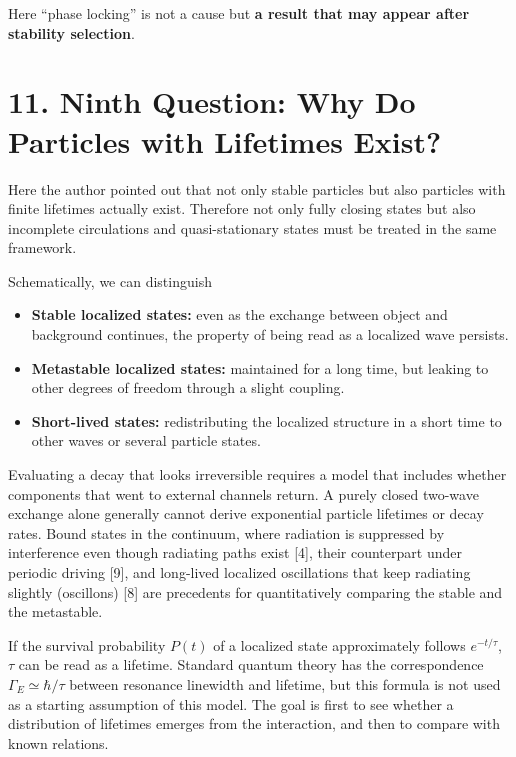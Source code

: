 \documentclass[
  a4paper,
]{article}
\providecommand{\tightlist}{%
  \setlength{\itemsep}{0pt}\setlength{\parskip}{0pt}}
\begin{document}
Here ``phase locking'' is not a cause but \textbf{a result that may
appear after stability selection}.

\section{11. Ninth Question: Why Do Particles with Lifetimes
Exist?}\label{ninth-question-why-do-particles-with-lifetimes-exist}

Here the author pointed out that not only stable particles but also
particles with finite lifetimes actually exist. Therefore not only fully
closing states but also incomplete circulations and quasi-stationary
states must be treated in the same framework.

Schematically, we can distinguish

\begin{itemize}
\tightlist
\item
  \textbf{Stable localized states:} even as the exchange between object
  and background continues, the property of being read as a localized
  wave persists.
\item
  \textbf{Metastable localized states:} maintained for a long time, but
  leaking to other degrees of freedom through a slight coupling.
\item
  \textbf{Short-lived states:} redistributing the localized structure in
  a short time to other waves or several particle states.
\end{itemize}

Evaluating a decay that looks irreversible requires a model that
includes whether components that went to external channels return. A
purely closed two-wave exchange alone generally cannot derive
exponential particle lifetimes or decay rates. Bound states in the
continuum, where radiation is suppressed by interference even though
radiating paths exist {[}4{]}, their counterpart under periodic driving
{[}9{]}, and long-lived localized oscillations that keep radiating
slightly (oscillons) {[}8{]} are precedents for quantitatively comparing
the stable and the metastable.

If the survival probability \(P(t)\) of a localized state approximately
follows \(e^{-t/\tau}\), \(\tau\) can be read as a lifetime. Standard
quantum theory has the correspondence \(\Gamma_E\simeq\hbar/\tau\)
between resonance linewidth and lifetime, but this formula is not used
as a starting assumption of this model. The goal is first to see whether
a distribution of lifetimes emerges from the interaction, and then to
compare with known relations.
\end{document}
